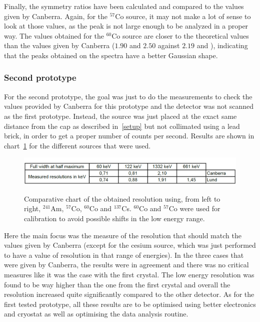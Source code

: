 \documentclass[11pt,a4paper]{article}
\begin{document}
Finally, the symmetry ratios have been calculated and compared to the values given by Canberra. Again, for the $^{57}$Co source, it may not make a lot of sense to look at those values, as the peak is not large enough to be analyzed in a proper way. The values obtained for the $^{60}$Co source are closer to the theoretical values than the values given by Canberra ($1.90$ and $2.50$ against $2.19$ and $ $), indicating that the peaks obtained on the spectra have a better Gaussian shape.

\subsubsection{Second prototype}

For the second prototype, the goal was just to do the measurements to check the values provided by Canberra for this prototype and the detector was not scanned as the first prototype. Instead, the source was just placed at the exact same distance from the cap as described in~\ref{setup} but not collimated using a lead brick, in order to get a proper number of counts per second. Results are shown in chart~\ref{recap2} for the different sources that were used.

\begin{figure}[!h]
\centering
\caption{Comparative chart of the obtained resolution using, from left to right, $^{241}$Am, $^{57}$Co, $^{60}$Co and $^{137}$Cs. $^{60}$Co and $^{57}$Co were used for calibration to avoid possible shifts in the low energy range.}
\includegraphics[scale=0.6]{result_2.png}
\label{recap2}
\end{figure}
Here the main focus was the measure of the resolution that should match the values given by Canberra (except for the cesium source, which was just performed to have a value of resolution in that range of energies). In the three cases that were given by Canberra, the results were in agreement and there was no critical measures like it was the case with the first crystal. The low energy resolution was found to be way higher than the one from the first crystal and overall the resolution increased quite significantly compared to the other detector. As for the first tested prototype, all these results are to be optimised using better electronics and cryostat as well as optimising the data analysis routine.
\end{document}
